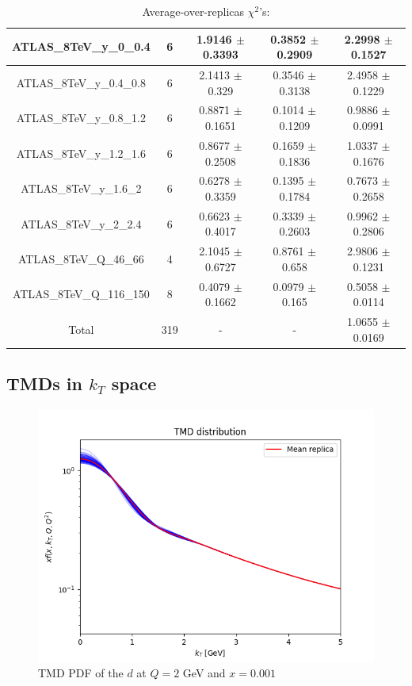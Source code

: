 \documentclass[
]{article}
\begin{document}
\begin{table}[h]
\begin{tabular}{|c|c|c|c|c|}
ATLAS\_8TeV\_y\_0\_0.4 & 6 & 1.9146 \(\pm\) 0.3393 & 0.3852 \(\pm\)
0.2909 & 2.2998 \(\pm\) 0.1527 \\ \hline
ATLAS\_8TeV\_y\_0.4\_0.8 & 6 & 2.1413 \(\pm\) 0.329 & 0.3546 \(\pm\)
0.3138 & 2.4958 \(\pm\) 0.1229 \\ \hline
ATLAS\_8TeV\_y\_0.8\_1.2 & 6 & 0.8871 \(\pm\) 0.1651 & 0.1014 \(\pm\)
0.1209 & 0.9886 \(\pm\) 0.0991 \\ \hline
ATLAS\_8TeV\_y\_1.2\_1.6 & 6 & 0.8677 \(\pm\) 0.2508 & 0.1659 \(\pm\)
0.1836 & 1.0337 \(\pm\) 0.1676 \\ \hline
ATLAS\_8TeV\_y\_1.6\_2 & 6 & 0.6278 \(\pm\) 0.3359 & 0.1395 \(\pm\)
0.1784 & 0.7673 \(\pm\) 0.2658 \\ \hline
ATLAS\_8TeV\_y\_2\_2.4 & 6 & 0.6623 \(\pm\) 0.4017 & 0.3339 \(\pm\)
0.2603 & 0.9962 \(\pm\) 0.2806 \\ \hline
ATLAS\_8TeV\_Q\_46\_66 & 4 & 2.1045 \(\pm\) 0.6727 & 0.8761 \(\pm\)
0.658 & 2.9806 \(\pm\) 0.1231 \\ \hline
ATLAS\_8TeV\_Q\_116\_150 & 8 & 0.4079 \(\pm\) 0.1662 & 0.0979 \(\pm\)
0.165 & 0.5058 \(\pm\) 0.0114 \\ \hline
Total & 319 & - & - & 1.0655 \(\pm\) 0.0169 \\ \hline

\end{tabular}

\caption{Average-over-replicas \(\chi^2\)'s:}

\end{table}

\hypertarget{tmds-in-k_t-space}{%
\subsection{\texorpdfstring{TMDs in \(k_T\)
space}{TMDs in k\_T space}}\label{tmds-in-k_t-space}}

\begin{figure}
\centering
\includegraphics{pngplots/tmd_1_2_0.001.png}
\caption{TMD PDF of the \(d\) at \(Q = 2\) GeV and \(x = 0.001\)}
\end{figure}
\end{document}

